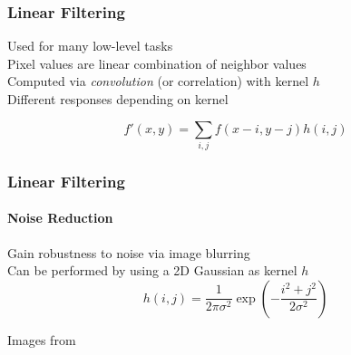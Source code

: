 \documentclass[xetex,professionalfont]{beamer}
\begin{document}
\begin{frame}
\frametitle{Linear Filtering}

Used for many low-level tasks\\\medskip
Pixel values are linear combination of neighbor values\\\medskip
Computed via \emph{convolution} (or correlation) with kernel $h$ \\\medskip
Different responses depending on kernel

\bigskip
\[
f'(x,y) = \sum_{i,j}f(x-i,y-j)h(i,j) %
\]

\end{frame}


\begin{frame}
\frametitle{Linear Filtering}
\framesubtitle{Noise Reduction}

Gain robustness to noise via image blurring\\\medskip
Can be performed by using a 2D Gaussian as kernel $h$ %
\[
h(i,j)=\frac{1}{2\pi\sigma^2}\exp\left(-\frac{i^2+j^2}{2\sigma^2}\right)
\]

\begin{center}
    {\centering Images from \cite{prince12}}
\end{center}

\end{frame}

\end{document}
